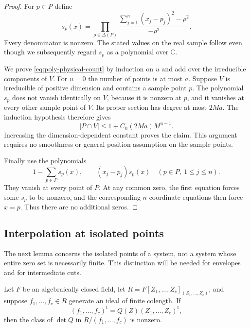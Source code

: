 \begin{proof}
For $p\in P$ define
\[
 s_p(x)=\prod_{\rho\in\Delta(P)}
       \frac{\sum_{j=1}^n(x_j-p_j)^2-\rho^2}{-\rho^2}.
\]
Every denominator is nonzero.  The stated values on the real sample follow even though we subsequently regard $s_p$ as a polynomial over $\mathbb{C}$.

We prove \eqref{eq:poly-physical-count} by induction on $u$ and add over the irreducible components of $V$.  For $u=0$ the number of points is at most $a$.  Suppose $V$ is irreducible of positive dimension and contains a sample point $p$.  The polynomial $s_p$ does not vanish identically on $V$, because it is nonzero at $p$, and it vanishes at every other sample point of $V$.  Its proper section has degree at most $2Ma$.  The induction hypothesis therefore gives
\[
 |P\cap V|\le 1+C_n(2Ma)M^{u-1}.
\]
Increasing the dimension-dependent constant proves the claim.  This argument requires no smoothness or general-position assumption on the sample points.

Finally use the polynomials
\begin{equation}\label{eq:poly-exact-isolation}
 1-\sum_{p\in P}s_p(x),\qquad
 (x_j-p_j)s_p(x)\quad(p\in P,\ 1\le j\le n).
\end{equation}
They vanish at every point of $P$.  At any common zero, the first equation forces some $s_p$ to be nonzero, and the corresponding $n$ coordinate equations then force $x=p$.  Thus there are no additional zeros.
\end{proof}

\subsection{Interpolation at isolated points}

The next lemma concerns the isolated points of a system, not a system whose entire zero set is necessarily finite.  This distinction will be needed for envelopes and for intermediate cuts.

\begin{lemma}
\label{lem:poly-socle}
Let $F$ be an algebraically closed field, let $R=F[Z_1,\ldots,Z_c]_{(Z_1,\ldots,Z_c)}$, and suppose $f_1,\ldots,f_c\in R$ generate an ideal of finite colength.  If
\[
 (f_1,\ldots,f_c)^{\mathsf t}
       =Q(Z)(Z_1,\ldots,Z_c)^{\mathsf t},
\]
then the class of $\det Q$ in $R/(f_1,\ldots,f_c)$ is nonzero.
\end{lemma}

